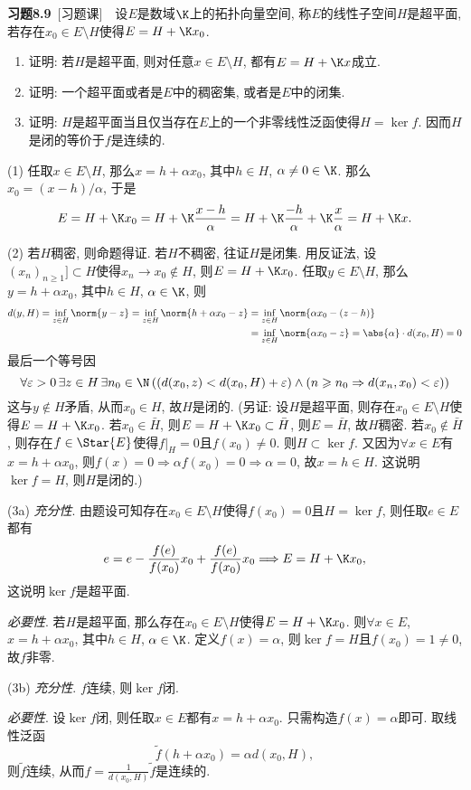 	\textbf{习题8.9}\ [习题课]\ \ 设$ E $是数域$ \K $上的拓扑向量空间, 称$ E $的线性子空间$ H $是超平面, 若存在$ x_0\in E\setminus H $使得$ E=H+\K x_0 $.
	\begin{enumerate}
	\item 证明: 若$ H $是超平面, 则对任意$ x\in E\setminus H $, 都有$ E=H+\K x $成立.
	\item 证明: 一个超平面或者是$ E $中的稠密集, 或者是$ E $中的闭集.
	\item 证明: $ H $是超平面当且仅当存在$ E $上的一个非零线性泛函使得$ H=\ker f $. 因而$ H $是闭的等价于$ f $是连续的.
	\end{enumerate}
	\begin{answer}
	(1) 任取$ x\in E\setminus H $, 那么$ x=h+\alpha x_0 $, 其中$ h\in H $, $ \alpha\ne 0\in\K $. 那么$ x_0=(x-h)/\alpha $, 于是
	\[
	E=H+\K x_0=H+\K\frac{x-h}{\alpha}=H+\K\frac{-h}{\alpha}+\K\frac{x}{\alpha}=H+\K x.
	\]
	
	(2) 若$ H $稠密, 则命题得证. 若$ H $不稠密, 往证$ H $是闭集. 用反证法, 设$ (x_n)_{n\geqslant 1}]\subset H $使得$ x_n\to x_0\notin H $, 则$ E=H+\K x_0 $. 任取$ y\in E\setminus H $, 那么$ y=h+\alpha x_0 $, 其中$ h\in H $, $ \alpha\in\K $, 则
	\[
	\begin{aligned}
	d(y,H)=\inf_{z\in H}\norm{y-z}=\inf_{z\in H}\norm{h+\alpha x_0-z}&=\inf_{z\in H}\norm{\alpha x_0-(z-h)}\\&=\inf_{z\in H}\norm{\alpha x_0-z}=\abs{\alpha}\cdot d(x_0,H)=0
	\end{aligned}
	\]
	最后一个等号因
	\[
	\forall\varepsilon>0\,\exists z\in H\,\exists n_0\in\N\,((d(x_0,z)<d(x_0,H)+\varepsilon)\land(n\geqslant n_0\Rightarrow d(x_n,x_0)<\varepsilon))
	\]
	这与$ y\notin H $矛盾, 从而$ x_0\in H $, 故$ H $是闭的.
	(另证: 设$ H $是超平面, 则存在$ x_0\in E\setminus H $使得$ E=H+\K x_0 $. 若$ x_0\in\bar{H} $, 则$ E=H+\K x_0\subset\bar{H} $, 则$ E=\bar{H} $, 故$ H $稠密. 若$ x_0\notin \bar{H} $, 则存在$ f\in\Star{E} $使得$ f\rvert_H=0 $且$ f(x_0)\ne 0 $. 则$ H\subset\ker f $. 又因为$ \forall x\in E $有$ x=h+\alpha x_0 $, 则$ f(x)=0\Rightarrow\alpha f(x_0)=0\Rightarrow \alpha=0 $, 故$ x=h\in H $. 这说明$ \ker f=H $, 则$ H $是闭的.)
	
	(3a) \textsl{充分性}. 由题设可知存在$ x_0\in E\setminus H $使得$ f(x_0)=0 $且$ H=\ker f $, 则任取$ e\in E $都有
	\[
	e=e-\frac{f(e)}{f(x_0)}x_0+\frac{f(e)}{f(x_0)}x_0\Longrightarrow E=H+\K x_0,
	\]
	这说明$ \ker f $是超平面.
	
	\textsl{必要性}. 若$ H $是超平面, 那么存在$ x_0\in E\setminus H $使得$ E=H+\K x_0 $. 则$ \forall x\in E $, $ x=h+\alpha x_0 $, 其中$ h\in H $, $ \alpha\in\K $. 定义$ f(x)=\alpha $, 则$ \ker f=H $且$ f(x_0)=1\ne 0 $, 故$ f $非零.
	
	(3b) \textsl{充分性}. $ f $连续, 则$ \ker f $闭.
	
	\textsl{必要性}. 设$ \ker f $闭, 则任取$ x\in E $都有$ x=h+\alpha x_0 $. 只需构造$ f(x)=\alpha $即可. 取线性泛函
	\[
	\tilde{f}(h+\alpha x_0)=\alpha d(x_0,H),
	\]
	则$ \tilde{f} $连续, 从而$ f=\frac{1}{d(x_0,H)}\tilde{f} $是连续的.\qedhere
	\end{answer}
